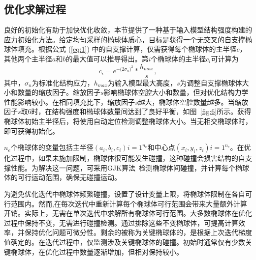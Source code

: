 \subsection{优化求解过程}
良好的初始化有助于加快优化收敛，本节提供了一种基于输入模型结构强度构建的应力初始化方法。给定均匀采样的椭球体质心，目标是获得一个无交叉的自支撑椭球体填充。根据公式 (\ref{eq:1}) 中的自支撑计算，仅需获得每个椭球体的主半径$c$，其他两个主半径$a$和$b$的最大值可以推导得出。第$i$个椭球体的主半径$c_i$可计算为
\begin{equation}
  c_{i} = e^{-{(2\sigma_{n}})^2}*\frac{h_{max}}{s},
  \label{eq:6}
\end{equation}
其中，$\sigma_n$为标准化结构应力，$h_{max}$为输入模型最大高度，$s$为调整自支撑椭球体大小和数量的缩放因子。缩放因子$s$影响椭球体空腔大小和数量，但对优化结构力学性能影响较小。在相同填充比下，缩放因子$s$越大，椭球体空腔数量越多。当缩放因子$s$取6时，在结构强度和椭球体数量间达到了良好平衡，如图~\ref{fig:6}所示。获得椭球体初始主半径后，将使用自动定位检测调整椭球体大小。当无相交椭球体时，即可获得初始化。


$n_e$个椭球体的变量包括主半径${(a_i,b_i,c_i)}{i=1}^{n_e}$和中心点${(x_i,y_i,z_i)}{i=1}^{n_e}$。在优化过程中，如果未施加限制，椭球体很可能发生碰撞，这种碰撞会损害结构的自支撑性能。为解决这一问题，可采用GJK算法~\cite{gilbert1988fast}检测椭球体间碰撞，并计算每个椭球体的可行运动范围，确保无碰撞运动。

为避免优化迭代中椭球体频繁碰撞，设置了设计变量上限，将椭球体限制在各自可行范围内。然而,在每次迭代中重新计算每个椭球体可行范围会带来大量额外计算开销。实际上，无需在单次迭代中求解所有椭球体可行范围。大多数椭球体在优化过程中保持不变，无需进行碰撞检测。通过排除这些不变椭球体，可提高计算效率，并保持优化问题可微分性。剩余的被称为关键椭球体的，是根据上次迭代梯度值确定的。在迭代过程中，仅监测涉及关键椭球体的碰撞。初始时通常仅有少数关键椭球体，在优化过程中数量逐渐增加，但相对保持较小。

